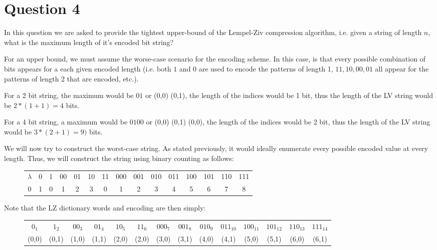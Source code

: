 \section{Question 4}
In this question we are asked to provide the tightest upper-bound of the Lempel-Ziv compression algorithm, i.e. given a string of length $n$, what is the maximum length of it's encoded bit string?

For an upper bound, we must assume the worse-case scenario for the encoding scheme.  In this case, is that every possible combination of bits appears for a each given encoded length (i.e. both $1$ and $0$ are used to encode the patterns of length 1, $11, 10, 00, 01$ all appear for the patterns of length 2 that are encoded, etc.).

For a 2 bit string, the maximum would be $01$ or (0,0) (0,1), the length of the indices would be 1 bit, thus the length of the LV string would be $2*(1+1) = 4$ bits.

For a 4 bit string, a maximum would be $0100$ or (0,0) (0,1) (0,0), the length of the indices would be 2 bit, thus the length of the LV string would be $3*(2+1) = 9)$ bits.

We will now try to construct the worst-case string.  As stated previously, it would ideally enumerate every possible encoded value at every length.  Thus, we will construct the string using binary counting as follows:
\begin{figure}[!h]
\begin{center}

\begin{tabular}{ccccccccccccccc}
$\lambda$ & 0& 1 & 00 & 01 & 10 & 11 & 000 & 001 & 010 & 011 & 100 & 101 & 110 & 111\\
0 & 1 & 0 & 1 & 2 & 3 & 0 & 1 &  2 & 3 & 4 & 5 & 6 & 7 & 8\\
\end{tabular}
\end{center}
\end{figure}
Note that the LZ dictionary words and encoding are then simply:

\begin{figure}[!h]
\small
\setlength{\tabcolsep}{.27em}
\begin{center}
\begin{tabular}{cccccccccccccc}
$0_{1}$ 	& $1_{2}$ & $00_{3}$ 	& $01_{4}$ 	& $10_{5}$ 	& $11_{6}$ 	& $000_{7}$ 	& $001_{8}$ 	& $010_{9}$ 	& $011_{10}$ 	& $100_{11}$ 	& $101_{12}$ 	& $110_{13}$ 	& $111_{14}$\\
(0,0) 		&  (0,1)	& (1,0)		& (1,1)		& (2,0)		& (2,0)		& (3,0)		& (3,1)		& (4,0)		& (4,1)		& (5,0)		& (5,1)		& (6,0)		& (6,1)\\
\end{tabular}
\end{center}
\end{figure}

